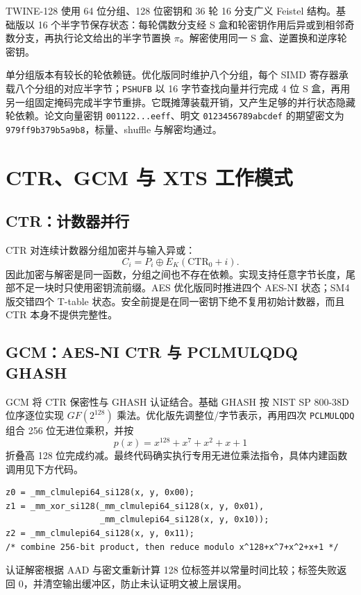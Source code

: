 \documentclass[a4paper,12pt]{ctexart}
\begin{document}
TWINE-128 使用 64 位分组、128 位密钥和 36 轮 16 分支广义 Feistel 结构。基础版以 16 个半字节保存状态：每轮偶数分支经 S 盒和轮密钥作用后异或到相邻奇数分支，再执行论文给出的半字节置换 $\pi$。解密使用同一 S 盒、逆置换和逆序轮密钥。

单分组版本有较长的轮依赖链。优化版同时维护八个分组，每个 SIMD 寄存器承载八个分组的对应半字节；\texttt{PSHUFB} 以 16 字节查找向量并行完成 4 位 S 盒，再用另一组固定掩码完成半字节重排。它既摊薄装载开销，又产生足够的并行状态隐藏轮依赖。论文向量密钥 \texttt{001122...eeff}、明文 \texttt{0123456789abcdef} 的期望密文为 \texttt{979ff9b379b5a9b8}，标量、shuffle 与解密均通过。

\section{CTR、GCM 与 XTS 工作模式}

\subsection{CTR：计数器并行}

CTR 对连续计数器分组加密并与输入异或：
\[
C_i=P_i\oplus E_K(\mathrm{CTR}_0+i).
\]
因此加密与解密是同一函数，分组之间也不存在依赖。实现支持任意字节长度，尾部不足一块时只使用密钥流前缀。AES 优化版同时推进四个 AES-NI 状态；SM4 版交错四个 T-table 状态。安全前提是在同一密钥下绝不复用初始计数器，而且 CTR 本身不提供完整性。

\subsection{GCM：AES-NI CTR 与 PCLMULQDQ GHASH}

GCM 将 CTR 保密性与 GHASH 认证结合。基础 GHASH 按 NIST SP 800-38D 位序逐位实现 $GF(2^{128})$ 乘法。优化版先调整位/字节表示，再用四次 \texttt{PCLMULQDQ} 组合 256 位无进位乘积，并按
\[
p(x)=x^{128}+x^7+x^2+x+1
\]
折叠高 128 位完成约减。最终代码确实执行专用无进位乘法指令，具体内建函数调用见下方代码。

\begin{lstlisting}
z0 = _mm_clmulepi64_si128(x, y, 0x00);
z1 = _mm_xor_si128(_mm_clmulepi64_si128(x, y, 0x01),
                   _mm_clmulepi64_si128(x, y, 0x10));
z2 = _mm_clmulepi64_si128(x, y, 0x11);
/* combine 256-bit product, then reduce modulo x^128+x^7+x^2+x+1 */
\end{lstlisting}

认证解密根据 AAD 与密文重新计算 128 位标签并以常量时间比较；标签失败返回 0，并清空输出缓冲区，防止未认证明文被上层误用。
\end{document}
